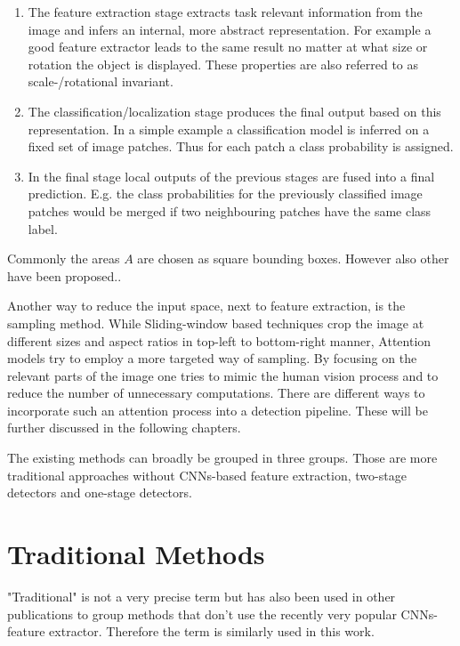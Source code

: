 	\begin{enumerate}
	\item The feature extraction stage extracts task relevant information from the image and infers an internal, more abstract representation. For example a good feature extractor leads to the same result no matter at what size or rotation the object is displayed. These properties are also referred to as scale-/rotational invariant.
	
	\item The classification/localization stage produces the final output based on this representation. In a simple example a classification model is inferred on a fixed set of image patches. Thus for each patch a class probability is assigned.
	
	\item In the final stage local outputs of the previous stages are fused into a final prediction. E.g. the class probabilities for the previously classified image patches would be merged if two neighbouring patches have the same class label.
\end{enumerate}  
	
	Commonly the areas $A$ are chosen as square bounding boxes. However also other have been proposed..	
	
	Another way to reduce the input space, next to feature extraction, is the sampling method. While Sliding-window based techniques crop the image at different sizes and aspect ratios in top-left to bottom-right manner, Attention models try to employ a more targeted way of sampling. By focusing on the relevant parts of the image one tries to mimic the human vision process and to reduce the number of unnecessary computations. There are different ways to incorporate such an attention process into a detection pipeline. These will be further discussed in the following chapters.

	The existing methods can broadly be grouped in three groups. Those are more traditional approaches without \acp{CNN}-based feature extraction, two-stage detectors and one-stage detectors.
	
	\section{Traditional Methods}
	
	"Traditional" is not a very precise term but has also been used in other publications to  group methods that don't use the recently very popular \acp{CNN}-feature extractor. Therefore the term is similarly used in this work.
	
